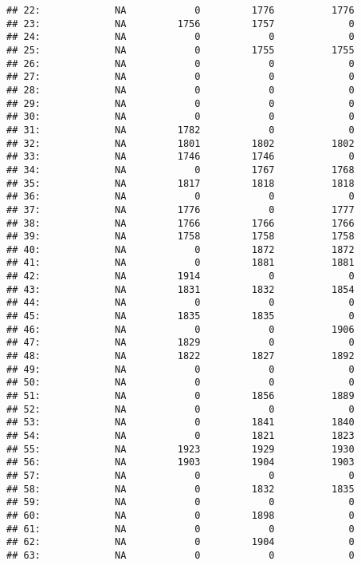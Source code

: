 \documentclass[]{book}
\begin{document}
\begin{verbatim}
## 22:             NA            0         1776          1776
## 23:             NA         1756         1757             0
## 24:             NA            0            0             0
## 25:             NA            0         1755          1755
## 26:             NA            0            0             0
## 27:             NA            0            0             0
## 28:             NA            0            0             0
## 29:             NA            0            0             0
## 30:             NA            0            0             0
## 31:             NA         1782            0             0
## 32:             NA         1801         1802          1802
## 33:             NA         1746         1746             0
## 34:             NA            0         1767          1768
## 35:             NA         1817         1818          1818
## 36:             NA            0            0             0
## 37:             NA         1776            0          1777
## 38:             NA         1766         1766          1766
## 39:             NA         1758         1758          1758
## 40:             NA            0         1872          1872
## 41:             NA            0         1881          1881
## 42:             NA         1914            0             0
## 43:             NA         1831         1832          1854
## 44:             NA            0            0             0
## 45:             NA         1835         1835             0
## 46:             NA            0            0          1906
## 47:             NA         1829            0             0
## 48:             NA         1822         1827          1892
## 49:             NA            0            0             0
## 50:             NA            0            0             0
## 51:             NA            0         1856          1889
## 52:             NA            0            0             0
## 53:             NA            0         1841          1840
## 54:             NA            0         1821          1823
## 55:             NA         1923         1929          1930
## 56:             NA         1903         1904          1903
## 57:             NA            0            0             0
## 58:             NA            0         1832          1835
## 59:             NA            0            0             0
## 60:             NA            0         1898             0
## 61:             NA            0            0             0
## 62:             NA            0         1904             0
## 63:             NA            0            0             0

\end{verbatim}
\end{document}
